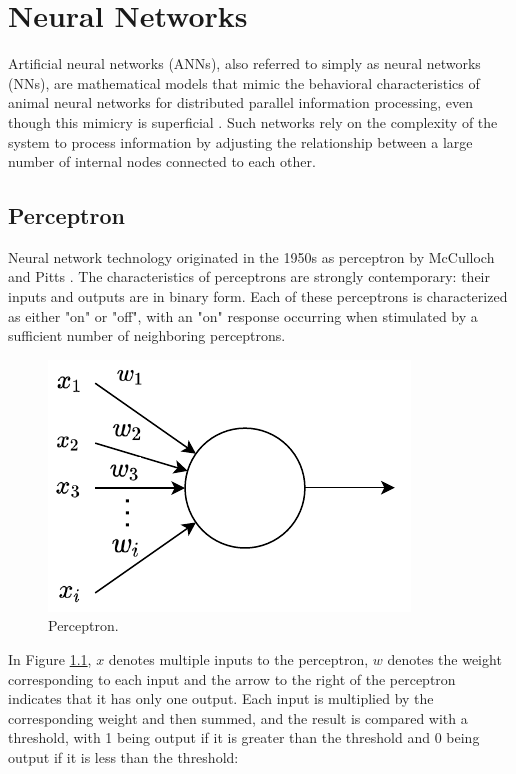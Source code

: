 \documentclass[
	parskip, 			   %
	twoside, 			   %
	DIV=14, 			   %
	BCOR=15.0mm, 		   %
	headsepline, 		   %
	open=right, 		   %
	captions=tableheading, %
	bibliography=totoc,    %
	numbers=noenddot       %
]{scrreprt}
\begin{document}
\clearpage
\chapter{Neural Networks}
\label{ch:chapter4}
Artificial neural networks (ANNs), also referred to simply as neural networks (NNs), are mathematical models that mimic the behavioral characteristics of animal neural networks for distributed parallel information processing, even though this mimicry is superficial \cite{russell2010artificial}. Such networks rely on the complexity of the system to process information by adjusting the relationship between a large number of internal nodes connected to each other.

\section{Perceptron}
Neural network technology originated in the 1950s as perceptron by McCulloch and Pitts \cite{mcculloch1943logical}. The characteristics of perceptrons are strongly contemporary: their inputs and outputs are in binary form. Each of these perceptrons is characterized as either "on" or "off", with an "on" response occurring when stimulated by a sufficient number of neighboring perceptrons.

\begin{figure}[h!]
    \centering
    \includegraphics[scale=1]{figures/perceptron.pdf}
    \caption{Perceptron.}
    \label{fig:perceptron}
\end{figure}

In Figure \ref{fig:perceptron}, $x$ denotes multiple inputs to the perceptron, $w$ denotes the weight corresponding to each input and the arrow to the right of the perceptron indicates that it has only one output. Each input is multiplied by the corresponding weight and then summed, and the result is compared with a threshold, with 1 being output if it is greater than the threshold and 0 being output if it is less than the threshold:
\end{document}
